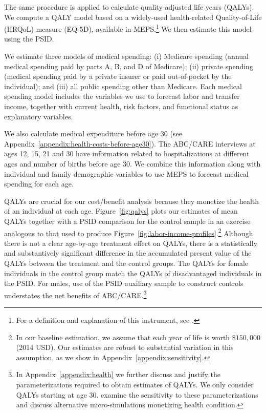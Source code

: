 The same procedure is applied to calculate quality-adjusted life years (QALYs). We compute a QALY model based on a widely-used health-related Quality-of-Life (HRQoL) measure (EQ-5D), available in MEPS.\footnote{For a definition and explanation of this instrument, see \citet{Dolan_1997_Modeling_MC,Shaw_etal_2005_EQ5D_MC}.} We then estimate this model using the PSID.

We estimate three models of medical spending: (i) Medicare spending (annual medical spending paid by parts A, B, and D of Medicare); (ii) private spending (medical spending paid by a private insurer or paid out-of-pocket by the individual); and (iii) all public spending other than Medicare. Each medical spending model includes the variables we use to forecast labor and transfer income, together with current health, risk factors, and functional status as explanatory variables.

We also calculate medical expenditure before age 30 (see Appendix~\ref{appendix:health-costs-before-age30}). The ABC/CARE interviews at ages 12, 15, 21 and 30 have information related to hospitalizations at different ages and number of births before age 30. We combine this information along with individual and family demographic variables to use MEPS to forecast medical spending for each age.

QALYs are crucial for our cost/benefit analysis because they monetize the health of an individual at each age. Figure~\ref{fig:qalys} plots our estimates of mean QALYs together with a PSID comparison for the control sample in an exercise analogous to that used to produce Figure~\ref{fig:labor-income-profiles}.\footnote{In our baseline estimation, we assume that each year of life is worth  $\$150,000$ (2014 USD). Our estimates are robust to substantial variation in this assumption, as we show in  Appendix~\ref{appendix:sensitivity}.} Although there is not a clear age-by-age treatment effect on QALYs, there is a statistically and substantively significant difference in the accumulated present value of the QALYs between the treatment and the control groups. The QALYs for female individuals in the control group match the QALYs of disadvantaged individuals in the PSID. For males, use of the PSID auxiliary sample to construct controls understates the net benefits of ABC/CARE.\footnote{In  Appendix~\ref{appendix:health} we further discuss and justify the parameterizations required to obtain estimates of QALYs. We only consider QALYs starting at age 30. \citet{Goldman_etal_2015_Future-America-Model} examine the sensitivity to these parameterizations and discuss alternative micro-simulations monetizing health condition.}

